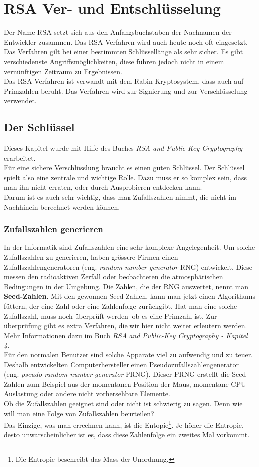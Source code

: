 \newpage
\section{RSA Ver- und Entschlüsselung}
Der Name RSA setzt sich aus den Anfangsbuchstaben der Nachnamen der Entwickler zusammen. Das RSA Verfahren wird auch heute noch oft eingesetzt. Das Verfahren gilt bei einer bestimmten Schlüssellänge als sehr sicher. Es gibt verschiedenste Angriffsmöglichkeiten, diese führen jedoch nicht in einem vernünftigen Zeitraum zu Ergebnissen.\\
Das RSA Verfahren ist verwandt mit dem Rabin-Kryptosystem, dass auch auf Primzahlen beruht. Das Verfahren wird zur Signierung und zur Verschlüsselung verwendet. %

\subsection{Der Schlüssel}
Dieses Kapitel wurde mit Hilfe des Buches \textit{RSA and Public-Key Cryptography} erarbeitet.\\[2ex]
%
Für eine sichere Verschlüsslung braucht es einen guten Schlüssel. Der Schlüssel spielt also eine zentrale und wichtige Rolle. Dazu muss er so komplex sein, dass man ihn nicht erraten, oder durch Ausprobieren entdecken kann.\\
Darum ist es auch sehr wichtig, dass man Zufallszahlen nimmt, die nicht im Nachhinein berechnet werden können.
%
\subsubsection{Zufallszahlen generieren}
In der Informatik sind Zufallszahlen eine sehr komplexe Angelegenheit. Um solche Zufallszahlen zu generieren, haben grössere Firmen einen Zufallszahlengeneratoren (eng. \textit{random number generator} RNG) entwickelt. Diese messen den radioaktiven Zerfall oder beobachteten die atmosphärischen Bedingungen in der Umgebung. Die Zahlen, die der RNG auswertet, nennt man \textbf{Seed-Zahlen}. Mit den gewonnen Seed-Zahlen, kann man jetzt einen Algorithums füttern, der eine Zahl oder eine Zahlenfolge zurückgibt. Hat man eine solche Zufallszahl, muss noch überprüft werden, ob es eine Primzahl ist. Zur überprüfung gibt es extra Verfahren, die wir hier nicht weiter erleutern werden. Mehr Informationen dazu im Buch \textit{RSA and Public-Key Cryptography - Kapitel 4}.\\
%
Für den normalen Benutzer sind solche Apparate viel zu aufwendig und zu teuer. Deshalb entwickelten Computerhersteller einen Pseudozufallszahlengenerator (eng. \textit{pseudo random number generator} PRNG). Dieser PRNG erstellt die Seed-Zahlen zum Beispiel aus der momentanen Position der Maus, momentane CPU Auslastung oder andere nicht vorhersehbare Elemente.\\
Ob die Zufallszahlen geeignet sind oder nicht ist schwierig zu sagen. Denn wie will man eine Folge von Zufallszahlen beurteilen?\\
Das Einzige, was man errechnen kann, ist die Entopie\footnote{Die Entropie beschreibt das Mass der Unordnung.}. Je höher die Entropie, desto unwarscheinlicher ist es, dass diese Zahlenfolge ein zweites Mal vorkommt.
